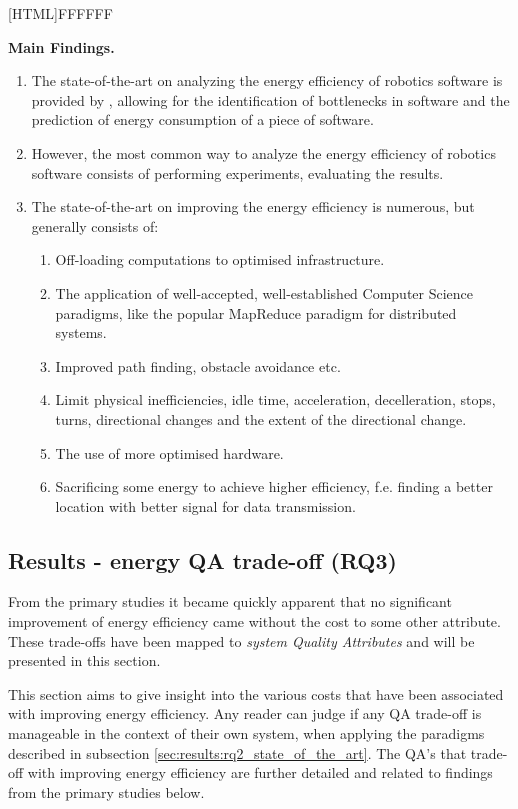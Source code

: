 \noindent{}[HTML]{FFFFFF}{\parbox{0.47\textwidth}{%
\noindent \textbf{Main Findings.}
\begin{enumerate}[nolistsep]
\item The state-of-the-art on analyzing the energy efficiency of robotics software is provided by \cite{hou2017novel_cloud_evaluation_model}, allowing for the identification of bottlenecks in software and the prediction of energy consumption of a piece of software.
\item However, the most common way to analyze the energy efficiency of robotics software consists of performing experiments, evaluating the results.
\item The state-of-the-art on improving the energy efficiency is numerous, but generally consists of:
    \begin{enumerate}
        \item Off-loading computations to optimised infrastructure.
        \item The application of well-accepted, well-established Computer Science paradigms, like the popular MapReduce paradigm for distributed systems.
        \item Improved path finding, obstacle avoidance etc.
        \item Limit physical inefficiencies, idle time, acceleration, decelleration, stops, turns, directional changes and the extent of the directional change.
        \item The use of more optimised hardware.
        \item Sacrificing some energy to achieve higher efficiency, f.e. finding a better location with better signal for data transmission.
    \end{enumerate}
\end{enumerate}}}

\subsection{Results - energy QA trade-off (RQ3)}
\label{sec:results:rq3_trade_off}
From the primary studies it became quickly apparent that no significant improvement of energy efficiency came without the cost
to some other attribute. These trade-offs have been mapped to 
\textit{system Quality Attributes\cite{iso2011quality_attributes}} and will be presented
in this section.

This section aims to give insight into the various costs that have been associated with improving energy efficiency.
Any reader can judge if any QA trade-off is manageable in the context of their own system, when applying the paradigms
described in subsection \ref{sec:results:rq2_state_of_the_art}. 
The QA's that trade-off with improving energy efficiency are further detailed and related to findings from the primary studies below.

